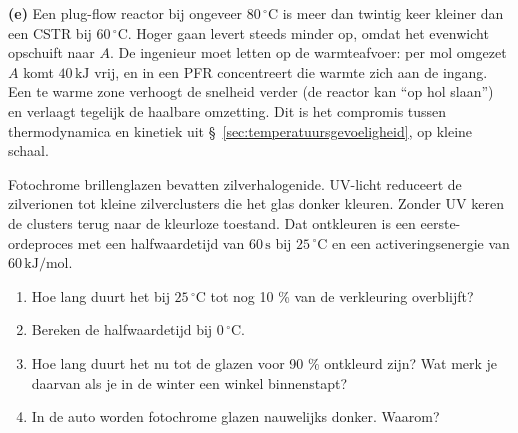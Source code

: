 \begin{oplossing}
\textbf{(e)} Een plug-flow reactor bij ongeveer \(80\,^\circ\mathrm{C}\) is meer dan twintig keer kleiner dan een CSTR bij \(60\,^\circ\mathrm{C}\). Hoger gaan levert steeds minder op, omdat het evenwicht opschuift naar \(A\). De ingenieur moet letten op de warmteafvoer: per mol omgezet \(A\) komt \(40\,\mathrm{kJ}\) vrij, en in een PFR concentreert die warmte zich aan de ingang. Een te warme zone verhoogt de snelheid verder (de reactor kan ``op hol slaan'') en verlaagt tegelijk de haalbare omzetting. Dit is het compromis tussen thermodynamica en kinetiek uit \S~\ref{sec:temperatuursgevoeligheid}, op kleine schaal.
\end{oplossing}

\begin{oefening}
Fotochrome brillenglazen bevatten zilverhalogenide. UV-licht reduceert de zilverionen tot kleine zilverclusters die het glas donker kleuren. Zonder UV keren de clusters terug naar de kleurloze toestand. Dat ontkleuren is een eerste-ordeproces met een halfwaardetijd van \(60\,\mathrm{s}\) bij \(25\,^\circ\mathrm{C}\) en een activeringsenergie van \(60\,\mathrm{kJ/mol}\).

\begin{enumerate}
\item[(a)]
  Hoe lang duurt het bij \(25\,^\circ\mathrm{C}\) tot nog 10 \% van de verkleuring overblijft?
\item[(b)]
  Bereken de halfwaardetijd bij \(0\,^\circ\mathrm{C}\).
\item[(c)]
  Hoe lang duurt het nu tot de glazen voor 90 \% ontkleurd zijn? Wat merk je daarvan als je in de winter een winkel binnenstapt?
\item[(d)]
  In de auto worden fotochrome glazen nauwelijks donker. Waarom?
\end{enumerate}
\end{oefening}

